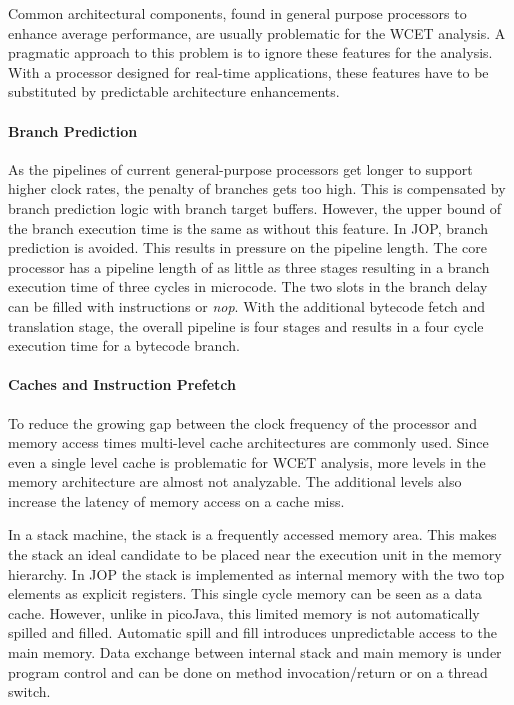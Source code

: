 Common architectural components, found in general purpose processors
to enhance average performance, are usually problematic for the WCET
analysis. A pragmatic approach to this problem is to ignore these
features for the analysis. With a processor designed for real-time
applications, these features have to be substituted by predictable
architecture enhancements.

\paragraph{Branch Prediction}

As the pipelines of current general-purpose processors get longer to
support higher clock rates, the penalty of branches gets too high.
This is compensated by branch prediction logic with branch target
buffers. However, the upper bound of the branch execution time is the
same as without this feature. In JOP, branch prediction is avoided.
This results in pressure on the pipeline length. The core processor
has a pipeline length of as little as three stages resulting in a
branch execution time of three cycles in microcode. The two slots in
the branch delay can be filled with instructions or \emph{nop}. With
the additional bytecode fetch and translation stage, the overall
pipeline is four stages and results in a four cycle execution time
for a bytecode branch.

\paragraph{Caches and Instruction Prefetch}

To reduce the growing gap between the clock frequency of the
processor and memory access times multi-level cache architectures
are commonly used. Since even a single level cache is problematic
for WCET analysis, more levels in the memory architecture are almost
not analyzable. The additional levels also increase the latency of
memory access on a cache miss.

In a stack machine, the stack is a frequently accessed memory area.
This makes the stack an ideal candidate to be placed near the
execution unit in the memory hierarchy. In JOP the stack is
implemented as internal memory with the two top elements as explicit
registers. This single cycle memory can be seen as a data cache.
However, unlike in picoJava, this limited memory is not automatically
spilled and filled. Automatic spill and fill introduces unpredictable
access to the main memory. Data exchange between internal stack and
main memory is under program control and can be done on method
invocation/return or on a thread switch.

